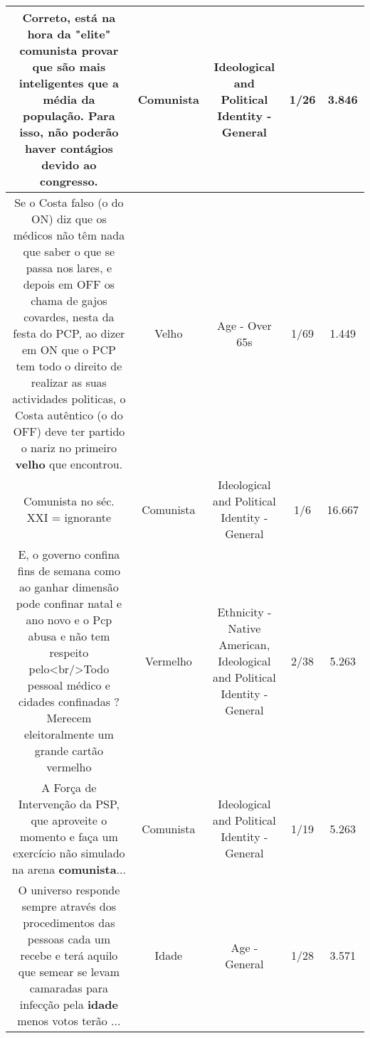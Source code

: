 \documentclass[11pt]{article}
\newlength\mylength
\begin{document}
\begin{center}
\begin{longtable}{|C{.65\mylength}|C{.30\mylength}|C{.12\mylength}|C{.12\mylength}|C{.12\mylength}|}
  \small Correto, está na hora da "elite" \textbf{comunista} provar que são mais inteligentes que a média da população. Para isso, não poderão haver contágios devido ao congresso.\normalsize   & Comunista & Ideological and Political Identity - General & 1/26 & 3.846 \\  \hline
  \small Se o Costa falso (o do ON) diz que os médicos não têm nada que saber o que se passa nos lares,  e depois em OFF os chama de gajos covardes, nesta da festa do PCP, ao dizer em ON que o PCP tem todo o direito de realizar as suas actividades politicas, o Costa autêntico (o do OFF) deve ter partido o nariz no primeiro \textbf{velho} que encontrou.\normalsize   & Velho & Age - Over 65s & 1/69 & 1.449 \\  \hline
  \small Comunista no séc. XXI = ignorante\normalsize   & Comunista & Ideological and Political Identity - General & 1/6 & 16.667 \\  \hline
  \small E, o governo confina fins de semana como ao ganhar dimensão pode confinar natal e ano novo e o Pcp abusa e não tem respeito pelo<br/>Todo pessoal médico e cidades confinadas ?Merecem eleitoralmente um grande cartão vermelho\normalsize   & Vermelho & Ethnicity - Native American, Ideological and Political Identity - General & 2/38 & 5.263 \\  \hline
  \small A Força de Intervenção da PSP, que aproveite o momento e faça um exercício não simulado na arena \textbf{comunista}...\normalsize   & Comunista & Ideological and Political Identity - General & 1/19 & 5.263 \\  \hline
  \small O universo responde sempre  através dos procedimentos das pessoas cada um recebe e terá aquilo que semear se levam camaradas para infecção pela \textbf{idade} menos votos terão ...\normalsize   & Idade & Age - General & 1/28 & 3.571 \\  \hline
  
\end{longtable}
\end{center}
\end{document}
